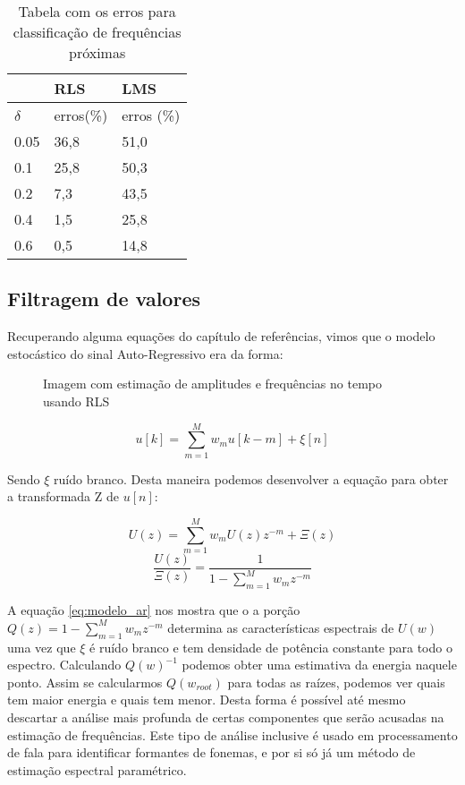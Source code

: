 \begin{table}[h]
	\centering
\begin{tabular}{|l|l|l|}
	\hline
	& RLS   & LMS        \\ \hline
	$\delta$ & erros(\%) & erros (\%) \\ \hline
	0.05  & 36,8  & 51,0       \\ \hline
	0.1   & 25,8  & 50,3       \\ \hline
	0.2   & 7,3   & 43,5       \\ \hline
	0.4   & 1,5   & 25,8       \\ \hline
	0.6   & 0,5   & 14,8       \\ \hline
	\end{tabular}
\caption{Tabela com os erros para classificação de frequências próximas}
\label{tab:tab_freq}
\end{table}

\subsection{Filtragem de valores}

Recuperando alguma equações do capítulo de referências, vimos que o modelo estocástico do sinal Auto-Regressivo era da forma:

\begin{figure}[H]
	\centering    
	\def\svgwidth{\columnwidth}
	
	\caption{Imagem com estimação de amplitudes e frequências no tempo usando RLS}
	\label{fig:im_RLS}
\end{figure}

\begin{equation}
u[k]=\sum_{m=1}^{M}w_m u[k-m] +\xi[n]
\end{equation}

Sendo $\xi$ ruído branco. Desta maneira podemos desenvolver a equação para obter a transformada Z de $u[n]$:

\begin{equation}
U(z)=\sum_{m=1}^{M}w_m U(z)z^{-m} +\Xi(z)
\end{equation}
\begin{equation}
\frac{U(z)}{\Xi(z)}=\frac{1}{1-\sum_{m=1}^{M}w_m z^{-m}}
\label{eq:modelo_ar}
\end{equation}


A equação \ref{eq:modelo_ar} nos mostra que o a porção $Q(z)=1-\sum_{m=1}^{M}w_m z^{-m}$ determina as características espectrais de $U(w)$ uma vez que $\xi$ é ruído branco e tem densidade de potência constante para todo o espectro. Calculando $Q(w)^{-1}$ podemos obter uma estimativa da energia naquele ponto. Assim se calcularmos $Q(w_{root})$ para todas  as raízes, podemos ver quais tem maior energia e quais tem menor. Desta forma é possível até mesmo descartar a análise mais profunda de certas componentes que serão acusadas na estimação de frequências. Este tipo de análise inclusive é usado em processamento de fala para identificar formantes de fonemas, e por si só já um método de estimação espectral paramétrico.

